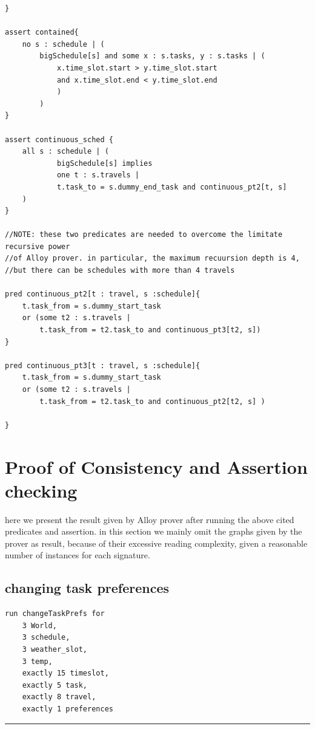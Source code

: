 \begin{verbatim}
}

assert contained{
    no s : schedule | (
        bigSchedule[s] and some x : s.tasks, y : s.tasks | (
            x.time_slot.start > y.time_slot.start 
            and x.time_slot.end < y.time_slot.end
            )
        )
}

assert continuous_sched {
    all s : schedule | (
            bigSchedule[s] implies
            one t : s.travels |
            t.task_to = s.dummy_end_task and continuous_pt2[t, s]
	)
}

//NOTE: these two predicates are needed to overcome the limitate recursive power
//of Alloy prover. in particular, the maximum recuursion depth is 4,
//but there can be schedules with more than 4 travels

pred continuous_pt2[t : travel, s :schedule]{
    t.task_from = s.dummy_start_task 
    or (some t2 : s.travels | 
        t.task_from = t2.task_to and continuous_pt3[t2, s]) 
}

pred continuous_pt3[t : travel, s :schedule]{
    t.task_from = s.dummy_start_task 
    or (some t2 : s.travels | 
        t.task_from = t2.task_to and continuous_pt2[t2, s] )

}

\end{verbatim}

\section{Proof of Consistency and Assertion checking}

here we present the result given by Alloy prover after running the above cited predicates and assertion. in this section we mainly omit the graphs given by the prover as result, because of their excessive reading complexity, given a reasonable number of instances for each signature.

\subsection{changing task preferences}
\begin{verbatim}
run changeTaskPrefs for 
    3 World, 
    3 schedule, 
    3 weather_slot, 
    3 temp, 
    exactly 15 timeslot, 
    exactly 5 task, 
    exactly 8 travel, 
    exactly 1 preferences 
\end{verbatim}
\rule{\textwidth}{0.4pt}

